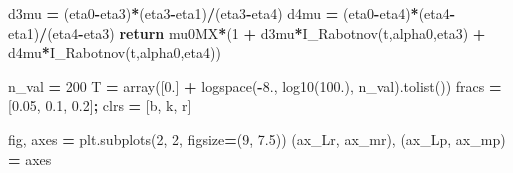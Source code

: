\documentclass[
  a4paper,
  numbers=noendperiod,
  DIV=12]{scrreprt}
\newenvironment{Shaded}{\begin{snugshade}}{\end{snugshade}}
\newcommand{\ControlFlowTok}[1]{\textcolor[rgb]{0.13,0.29,0.53}{\textbf{#1}}}
\newcommand{\DecValTok}[1]{\textcolor[rgb]{0.00,0.00,0.81}{#1}}
\newcommand{\FloatTok}[1]{\textcolor[rgb]{0.00,0.00,0.81}{#1}}
\newcommand{\NormalTok}[1]{#1}
\newcommand{\OperatorTok}[1]{\textcolor[rgb]{0.81,0.36,0.00}{\textbf{#1}}}
\newcommand{\StringTok}[1]{\textcolor[rgb]{0.31,0.60,0.02}{#1}}
\begin{document}
\begin{Shaded}
\begin{Highlighting}[]
\NormalTok{    d3mu }\OperatorTok{=}\NormalTok{ (eta0}\OperatorTok{{-}}\NormalTok{eta3)}\OperatorTok{*}\NormalTok{(eta3}\OperatorTok{{-}}\NormalTok{eta1)}\OperatorTok{/}\NormalTok{(eta3}\OperatorTok{{-}}\NormalTok{eta4)}
\NormalTok{    d4mu }\OperatorTok{=}\NormalTok{ (eta0}\OperatorTok{{-}}\NormalTok{eta4)}\OperatorTok{*}\NormalTok{(eta4}\OperatorTok{{-}}\NormalTok{eta1)}\OperatorTok{/}\NormalTok{(eta4}\OperatorTok{{-}}\NormalTok{eta3)}
    \ControlFlowTok{return}\NormalTok{ mu0MX}\OperatorTok{*}\NormalTok{(}\DecValTok{1} \OperatorTok{+}\NormalTok{ d3mu}\OperatorTok{*}\NormalTok{I\_Rabotnov(t,alpha0,eta3) }\OperatorTok{+}\NormalTok{ d4mu}\OperatorTok{*}\NormalTok{I\_Rabotnov(t,alpha0,eta4))}
\end{Highlighting}
\end{Shaded}

\begin{Shaded}
\begin{Highlighting}[]
\NormalTok{n\_val }\OperatorTok{=} \DecValTok{200}
\NormalTok{T }\OperatorTok{=}\NormalTok{ array([}\FloatTok{0.}\NormalTok{] }\OperatorTok{+}\NormalTok{ logspace(}\OperatorTok{{-}}\FloatTok{8.}\NormalTok{, log10(}\FloatTok{100.}\NormalTok{), n\_val).tolist())}
\NormalTok{fracs }\OperatorTok{=}\NormalTok{ [}\FloatTok{0.05}\NormalTok{, }\FloatTok{0.1}\NormalTok{, }\FloatTok{0.2}\NormalTok{]}\OperatorTok{;}\NormalTok{  clrs }\OperatorTok{=}\NormalTok{ [}\StringTok{\textquotesingle{}b\textquotesingle{}}\NormalTok{, }\StringTok{\textquotesingle{}k\textquotesingle{}}\NormalTok{, }\StringTok{\textquotesingle{}r\textquotesingle{}}\NormalTok{]}

\NormalTok{fig, axes }\OperatorTok{=}\NormalTok{ plt.subplots(}\DecValTok{2}\NormalTok{, }\DecValTok{2}\NormalTok{, figsize}\OperatorTok{=}\NormalTok{(}\DecValTok{9}\NormalTok{, }\FloatTok{7.5}\NormalTok{))}
\NormalTok{(ax\_Lr, ax\_mr), (ax\_Lp, ax\_mp) }\OperatorTok{=}\NormalTok{ axes}


\end{Highlighting}
\end{Shaded}
\end{document}
